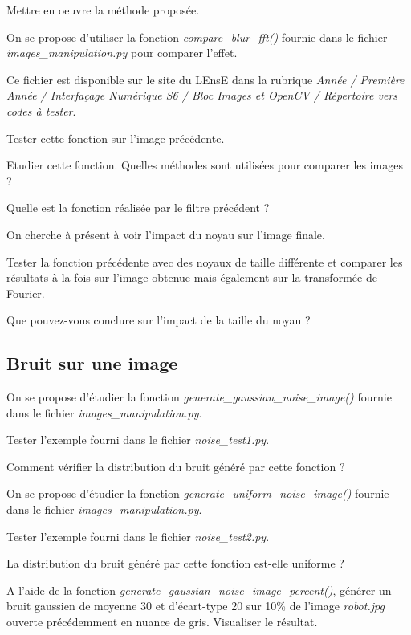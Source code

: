 \documentclass[a4paper,11pt,titlepage]{article} %
\begin{document}
\Manip Mettre en oeuvre la méthode proposée.

\medskip

On se propose d'utiliser la fonction \textsl{compare\_blur\_fft()} fournie dans le fichier \textsl{images\_manipulation.py} pour comparer l'effet. 

Ce fichier est disponible sur le site du LEnsE dans la rubrique \textit{Année / Première Année / Interfaçage Numérique S6 / Bloc Images et OpenCV / Répertoire vers codes à tester}.

\Manip Tester cette fonction sur l'image précédente.

\Quest Etudier cette fonction. Quelles méthodes sont utilisées pour comparer les images ?

\Quest Quelle est la fonction réalisée par le filtre précédent ?

\medskip

On cherche à présent à voir l'impact du noyau sur l'image finale.

\Manip Tester la fonction précédente avec des noyaux de taille différente et comparer les résultats à la fois sur l'image obtenue mais également sur la transformée de Fourier.

\Quest Que pouvez-vous conclure sur l'impact de la taille du noyau ?


\subsection{Bruit sur une image}

On se propose d'étudier la fonction \textsl{generate\_gaussian\_noise\_image()} fournie dans le fichier \textsl{images\_manipulation.py}.

\Manip Tester l'exemple fourni dans le fichier \textsl{noise\_test1.py}.

\Quest Comment vérifier la distribution du bruit généré par cette fonction ?

\medskip

On se propose d'étudier la fonction \textsl{generate\_uniform\_noise\_image()} fournie dans le fichier \textsl{images\_manipulation.py}.

\Manip Tester l'exemple fourni dans le fichier \textsl{noise\_test2.py}.

\Quest La distribution du bruit généré par cette fonction est-elle uniforme ?

\Manip A l'aide de la fonction \textsl{generate\_gaussian\_noise\_image\_percent()}, générer un bruit gaussien de moyenne 30 et d'écart-type 20 sur 10\% de l'image \textsl{robot.jpg} ouverte précédemment en nuance de gris. Visualiser le résultat.
\end{document}
